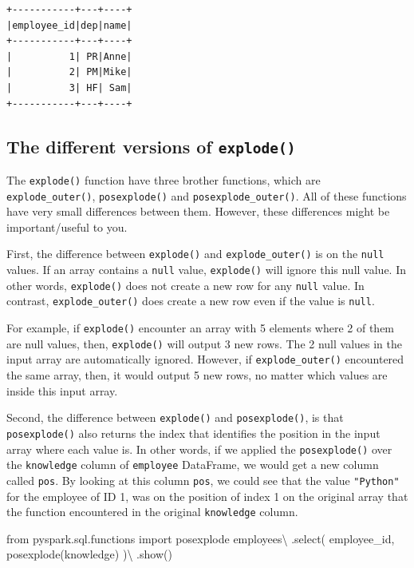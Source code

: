 \documentclass[
  11pt,
  letterpaper,
  DIV=11,
  numbers=noendperiod]{scrreprt}
\newenvironment{Shaded}{\begin{snugshade}}{\end{snugshade}}
\newcommand{\ImportTok}[1]{\textcolor[rgb]{0.00,0.46,0.62}{#1}}
\newcommand{\NormalTok}[1]{\textcolor[rgb]{0.00,0.23,0.31}{#1}}
\newcommand{\OperatorTok}[1]{\textcolor[rgb]{0.37,0.37,0.37}{#1}}
\newcommand{\StringTok}[1]{\textcolor[rgb]{0.13,0.47,0.30}{#1}}
\begin{document}
\begin{verbatim}
+-----------+---+----+
|employee_id|dep|name|
+-----------+---+----+
|          1| PR|Anne|
|          2| PM|Mike|
|          3| HF| Sam|
+-----------+---+----+
\end{verbatim}

\hypertarget{the-different-versions-of-explode}{%
\subsection{\texorpdfstring{The different versions of
\texttt{explode()}}{The different versions of explode()}}\label{the-different-versions-of-explode}}

The \texttt{explode()} function have three brother functions, which are
\texttt{explode\_outer()}, \texttt{posexplode()} and
\texttt{posexplode\_outer()}. All of these functions have very small
differences between them. However, these differences might be
important/useful to you.

First, the difference between \texttt{explode()} and
\texttt{explode\_outer()} is on the \texttt{null} values. If an array
contains a \texttt{null} value, \texttt{explode()} will ignore this null
value. In other words, \texttt{explode()} does not create a new row for
any \texttt{null} value. In contrast, \texttt{explode\_outer()} does
create a new row even if the value is \texttt{null}.

For example, if \texttt{explode()} encounter an array with 5 elements
where 2 of them are null values, then, \texttt{explode()} will output 3
new rows. The 2 null values in the input array are automatically
ignored. However, if \texttt{explode\_outer()} encountered the same
array, then, it would output 5 new rows, no matter which values are
inside this input array.

Second, the difference between \texttt{explode()} and
\texttt{posexplode()}, is that \texttt{posexplode()} also returns the
index that identifies the position in the input array where each value
is. In other words, if we applied the \texttt{posexplode()} over the
\texttt{knowledge} column of \texttt{employee} DataFrame, we would get a
new column called \texttt{pos}. By looking at this column \texttt{pos},
we could see that the value \texttt{"Python"} for the employee of ID 1,
was on the position of index 1 on the original array that the function
encountered in the original \texttt{knowledge} column.

\begin{Shaded}
\begin{Highlighting}[]
\ImportTok{from}\NormalTok{ pyspark.sql.functions }\ImportTok{import}\NormalTok{ posexplode}
\NormalTok{employees}\OperatorTok{\textbackslash{}}
\NormalTok{    .select(}
        \StringTok{\textquotesingle{}employee\_id\textquotesingle{}}\NormalTok{,}
\NormalTok{        posexplode(}\StringTok{\textquotesingle{}knowledge\textquotesingle{}}\NormalTok{)}
\NormalTok{    )}\OperatorTok{\textbackslash{}}
\NormalTok{    .show()}
\end{Highlighting}
\end{Shaded}
\end{document}
